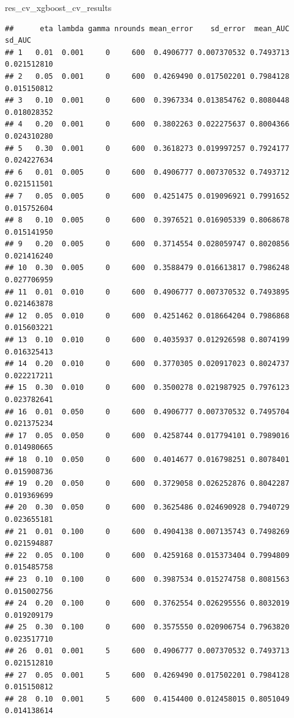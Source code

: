 \documentclass[
]{article}
\newenvironment{Shaded}{\begin{snugshade}}{\end{snugshade}}
\newcommand{\NormalTok}[1]{#1}
\begin{document}
\begin{Shaded}
\begin{Highlighting}[]
\NormalTok{res_cv_xgboost_cv_results}
\end{Highlighting}
\end{Shaded}

\begin{verbatim}
##      eta lambda gamma nrounds mean_error    sd_error  mean_AUC      sd_AUC
## 1   0.01  0.001     0     600  0.4906777 0.007370532 0.7493713 0.021512810
## 2   0.05  0.001     0     600  0.4269490 0.017502201 0.7984128 0.015150812
## 3   0.10  0.001     0     600  0.3967334 0.013854762 0.8080448 0.018028352
## 4   0.20  0.001     0     600  0.3802263 0.022275637 0.8004366 0.024310280
## 5   0.30  0.001     0     600  0.3618273 0.019997257 0.7924177 0.024227634
## 6   0.01  0.005     0     600  0.4906777 0.007370532 0.7493712 0.021511501
## 7   0.05  0.005     0     600  0.4251475 0.019096921 0.7991652 0.015752604
## 8   0.10  0.005     0     600  0.3976521 0.016905339 0.8068678 0.015141950
## 9   0.20  0.005     0     600  0.3714554 0.028059747 0.8020856 0.021416240
## 10  0.30  0.005     0     600  0.3588479 0.016613817 0.7986248 0.027706959
## 11  0.01  0.010     0     600  0.4906777 0.007370532 0.7493895 0.021463878
## 12  0.05  0.010     0     600  0.4251462 0.018664204 0.7986868 0.015603221
## 13  0.10  0.010     0     600  0.4035937 0.012926598 0.8074199 0.016325413
## 14  0.20  0.010     0     600  0.3770305 0.020917023 0.8024737 0.022217211
## 15  0.30  0.010     0     600  0.3500278 0.021987925 0.7976123 0.023782641
## 16  0.01  0.050     0     600  0.4906777 0.007370532 0.7495704 0.021375234
## 17  0.05  0.050     0     600  0.4258744 0.017794101 0.7989016 0.014980665
## 18  0.10  0.050     0     600  0.4014677 0.016798251 0.8078401 0.015908736
## 19  0.20  0.050     0     600  0.3729058 0.026252876 0.8042287 0.019369699
## 20  0.30  0.050     0     600  0.3625486 0.024690928 0.7940729 0.023655181
## 21  0.01  0.100     0     600  0.4904138 0.007135743 0.7498269 0.021594887
## 22  0.05  0.100     0     600  0.4259168 0.015373404 0.7994809 0.015485758
## 23  0.10  0.100     0     600  0.3987534 0.015274758 0.8081563 0.015002756
## 24  0.20  0.100     0     600  0.3762554 0.026295556 0.8032019 0.019209179
## 25  0.30  0.100     0     600  0.3575550 0.020906754 0.7963820 0.023517710
## 26  0.01  0.001     5     600  0.4906777 0.007370532 0.7493713 0.021512810
## 27  0.05  0.001     5     600  0.4269490 0.017502201 0.7984128 0.015150812
## 28  0.10  0.001     5     600  0.4154400 0.012458015 0.8051049 0.014138614

\end{verbatim}
\end{document}
